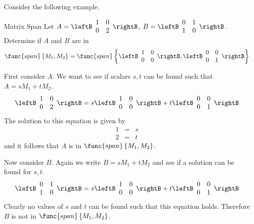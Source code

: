 Consider the following example.

\begin{example}{Matrix Span}\label{exa:matrixspan}
Let $A = \leftB \begin{array}{rr}
1 & 0 \\
0 & 2 
\end{array}\rightB$, $B = \leftB \begin{array}{rr}
0 & 1 \\
1 & 0 
\end{array}\rightB$. 
Determine if $A$ and $B$ are in 
\[
\func{span}\left\{ M_1, M_2 \right\} = \func{span} \left\{ \leftB \begin{array}{rr}
1 & 0 \\
0 & 0 
\end{array}\rightB, \leftB \begin{array}{rr}
0 & 0 \\
0 & 1 
\end{array}\rightB \right\}\] 
\end{example}

\begin{solution}

First consider $A$. We want to see if scalars $s,t$ can be found such that $A = s M_1 + t M_2$. 
\begin{equation*}
\leftB \begin{array}{rr}
1 & 0 \\
0 & 2 
\end{array}\rightB = 
s \leftB \begin{array}{rr}
1 & 0 \\
0 & 0 
\end{array}\rightB + t \leftB \begin{array}{rr}
0 & 0 \\
0 & 1 
\end{array}\rightB
\end{equation*}
The solution to this equation is given by 
\begin{eqnarray*}
1 &=& s \\
2 &=& t
\end{eqnarray*}
and it follows that $A$ is in $\func{span} \left\{ M_1, M_2 \right\}$. 

Now consider $B$. Again we write $B = sM_1 + t M_2$ and see if a solution can be found for $s, t$. 
\begin{equation*}
\leftB \begin{array}{rr}
0 & 1 \\
1 & 0 
\end{array}\rightB = 
s \leftB \begin{array}{rr}
1 & 0 \\
0 & 0 
\end{array}\rightB + t \leftB \begin{array}{rr}
0 & 0 \\
0 & 1 
\end{array}\rightB
\end{equation*}
Clearly no values of $s$ and $t$ can be found such that this equation holds. Therefore $B$ is not in $\func{span} \left\{ M_1, M_2 \right\}$.
\end{solution}

